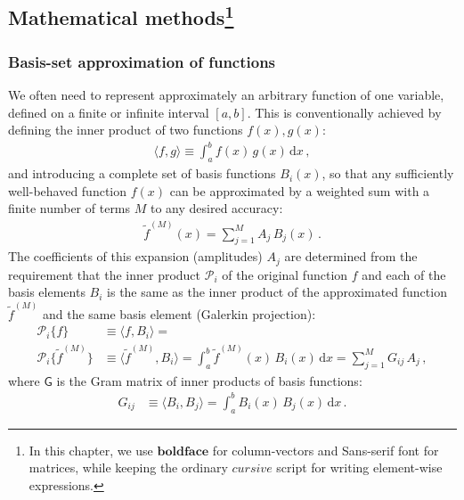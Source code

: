 \documentclass[12pt]{article}
\renewcommand{\d}{\mathrm{d}}
\begin{document}
\subsection[Mathematical methods]
{Mathematical methods\protect\footnote{
In this chapter, we use $\boldsymbol{boldface}$ for column-vectors and \textsf{Sans-serif} font for matrices, while keeping the ordinary $cursive$ script for writing element-wise expressions.}}

\subsubsection{Basis-set approximation of functions}  \label{sec:MathBasisSetDetails}

We often need to represent approximately an arbitrary function of one variable, defined on a finite or infinite interval $[a,b]$.
This is conventionally achieved by defining the inner product of two functions $f(x), g(x)$:
\begin{align}  \label{eq:InnerProduct}
\langle f, g \rangle \equiv \int_a^b f(x)\, g(x)\, \d x \,,
\end{align}
and introducing a complete set of basis functions $B_i(x)$, so that any sufficiently well-behaved function $f(x)$ can be approximated by a weighted sum with a finite number of terms $M$ to any desired accuracy:
\begin{align}  \label{eq:BasisApproximation}
\tilde f^{(M)}(x) = \sum_{j=1}^M A_j\,B_j(x) \,.
\end{align}
The coefficients of this expansion (amplitudes) $A_j$ are determined from the requirement that the inner product $\mathcal P_i$ of the original function $f$ and each of the basis elements $B_i$ is the same as the inner product of the approximated function $\tilde f^{(M)}$ and the same basis element (Galerkin projection):
\begin{subequations}  \label{eq:BasisExpansionCoefs}
\begin{align}
\mathcal P_i \{f\} &\equiv \langle f, B_i \rangle = \\
\mathcal P_i \{\tilde f^{(M)}\} &\equiv \langle \tilde f^{(M)}, B_i \rangle =
\int_a^b \tilde f^{(M)}(x)\, B_i(x)\, \d x = \sum_{j=1}^M G_{ij}\, A_j  \,,
\end{align}
\end{subequations}
where $\mathsf G$ is the Gram matrix of inner products of basis functions:
\begin{align}  \label{eq:BasisExpansionMatrix}
G_{ij} &\equiv \langle B_i, B_j \rangle  =  \int_a^b B_i(x)\,B_j(x)\,\d x \,.
\end{align}
\end{document}

